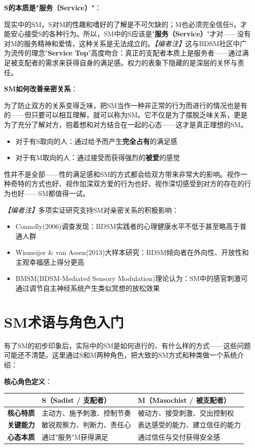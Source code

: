 \documentclass[12pt,UTF8]{ctexbook}
\begin{document}
\noindent\textbf{S的本质是"服务（Service）"}：

现实中的SM，S对M的性趣和嗜好的了解是不可欠缺的；M也必须完全信任S，才能安心接受S的各种行为。所以，SM中的S应该是"\textbf{服务（Service）}"才对——没有对M的服务精神和爱情，这种关系是无法成立的。\textit{【编者注】}这与BDSM社区中广为流传的理念"\textbf{Service Top}"高度吻合：真正的支配者本质上是服务者——通过满足被支配者的需求来获得自身的满足感。权力的表象下隐藏的是深层的关怀与责任。

\noindent\textbf{SM如何改善亲密关系}：

为了防止双方的关系变得乏味，把SM当作一种非正常的行为而进行的情况也是有的——但只要可以相互理解，就可以称为SM。它不仅是为了摆脱乏味关系，更是为了充分了解对方，抱着想和对方结合在一起的心态——这才是真正理想的SM。

\begin{itemize}
	\item 对于有S取向的人：通过给予而产生\textbf{完全占有}的满足感
	\item 对于有M取向的人：通过接受而获得强烈的\textbf{被爱}的感觉
\end{itemize}

性并不是全部——性的满足感和SM的方式都会给双方带来非常大的影响。视作一种奇特的方式也好、视作加深双方爱的行为也好、视作深切感受到对方的存在的行为也好——SM都值得一试。

\textit{【编者注】}多项实证研究支持SM对亲密关系的积极影响：
\begin{itemize}
	\item Connolly(2006)调查发现：BDSM实践者的心理健康水平不低于甚至略高于普通人群
	\item Wismeijer \& van Assen(2013)大样本研究：BDSM倾向者在外向性、开放性和主观幸福感上得分更高
	\item BMSM(BDSM-Mediated Sensory Modulation)理论认为：SM中的感官刺激可通过调节自主神经系统产生类似冥想的放松效果
\end{itemize}

\section{SM术语与角色入门}

有了SM的初步印象后，实际中的SM是如何进行的、有什么样的方式——这些问题可能还不清楚。这里通过S和M两种角色，把大致的SM方式和种类做一个系统介绍：

\noindent\textbf{核心角色定义}：

\begin{center}
\begin{tabular}{|p{3cm}|p{5.5cm}|p{5.5cm}|}
\hline
 & \textbf{S（Sadist / 支配者）} & \textbf{M（Masochist / 被支配者）} \\
\hline
\textbf{核心特质} &
主动方、施予刺激、控制节奏 &
被动方、接受刺激、交出控制权 \\
\hline
\textbf{关键能力} &
敏锐观察力、判断力、责任心 &
表达感受的能力、建立信任的能力 \\
\hline
\textbf{心态本质} &
通过"服务"M获得满足 &
通过信任与交付获得安全感 \\
\hline
\end{tabular}
\end{center}
\end{document}
